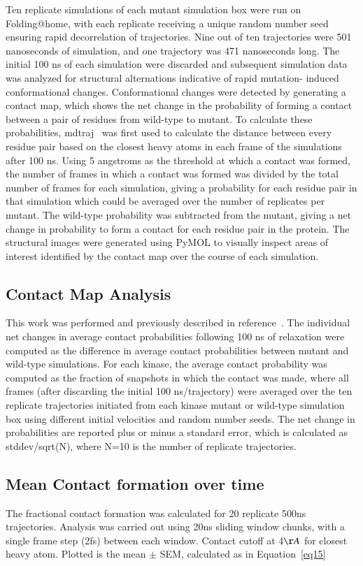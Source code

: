 \documentclass[phd,tocprelim]{cornell}
\begin{document}
Ten replicate simulations of each mutant simulation box were run on Folding@home, with each replicate receiving a unique random number seed ensuring rapid decorrelation of trajectories. Nine out of ten trajectories were 501 nanoseconds of simulation, and one trajectory was 471 nanoseconds long. The initial 100 ns of each simulation were discarded and subsequent simulation data was analyzed for structural alternations indicative of rapid mutation- induced conformational changes.
Conformational changes were detected by generating a contact map, which shows the net change in the probability of forming a contact between a pair of residues from wild-type to mutant. To calculate these probabilities, mdtraj~\citep{McGibbon:2015fv} was first used to calculate the distance between every residue pair based on the closest heavy atoms in each frame of the simulations after 100 ns. Using 5 angstroms as the threshold at which a contact was formed, the number of frames in which a contact was formed was divided by the total number of frames for each simulation, giving a probability for each residue pair in that simulation which could be averaged over the number of replicates per mutant. The wild-type probability was subtracted from the mutant, giving a net change in probability to form a contact for each residue pair in the protein. The structural images were generated using PyMOL to visually inspect areas of interest identified by the contact map over the course of each simulation.

\subsection{Contact Map Analysis}
This work was performed and previously described in reference~\cite{Xu:2016fw}. The individual net changes in average contact probabilities following 100 ns of relaxation were computed as the difference in average contact probabilities between mutant and wild-type simulations. For each kinase, the average contact probability was computed as the fraction of snapshots in which the contact was made, where all frames (after discarding the initial 100 ns/trajectory) were averaged over the ten replicate trajectories initiated from each kinase mutant or wild-type simulation box using different initial velocities and random number seeds. The net change in probabilities are reported plus or minus a standard error, which is calculated as stddev/sqrt(N), where N=10 is the number of replicate trajectories.

\subsection{Mean Contact formation over time}
The fractional contact formation was calculated for 20 replicate 500ns trajectories. Analysis was carried out using 20ns sliding window chunks, with a single frame step (2fs) between each window.  Contact cutoff at 4$\AA$ for closest heavy atom.  Plotted is the mean $\pm$ SEM, calculated as in Equation~\ref{eq15}
\end{document}
